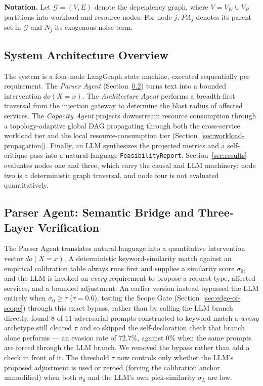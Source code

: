 \documentclass[journal, 10pt]{IEEEtran}
\begin{document}
\textbf{Notation.} Let $\mathcal{G} = (V, E)$ denote the dependency graph, where $V = V_W \cup V_R$ partitions into workload and resource nodes. For node $j$, $PA_j$ denotes its parent set in $\mathcal{G}$ and $N_j$ its exogenous noise term.

\subsection{System Architecture Overview}
The system is a four-node LangGraph state machine, executed sequentially per requirement. The \emph{Parser Agent} (Section~\ref{sec:parser-agent}) turns text into a bounded intervention $do(X{=}x)$. The \emph{Architecture Agent} performs a breadth-first traversal from the injection gateway to determine the blast radius of affected services. The \emph{Capacity Agent} projects downstream resource consumption through a topology-adaptive global DAG propagating through both the cross-service workload tier and the local resource-consumption tier (Section~\ref{sec:workload-propagation}). Finally, an LLM synthesizes the projected metrics and a self-critique pass into a natural-language \texttt{FeasibilityReport}. Section~\ref{sec:results} evaluates nodes one and three, which carry the causal and LLM machinery; node two is a deterministic graph traversal, and node four is not evaluated quantitatively.

\subsection{Parser Agent: Semantic Bridge and Three-Layer Verification}
\label{sec:parser-agent}
The Parser Agent translates natural language into a quantitative intervention vector $do(X=x)$. A deterministic keyword-similarity match against an empirical calibration table always runs first and supplies a similarity score $\sigma_0$, and the LLM is invoked on \emph{every} requirement to propose a request type, affected services, and a bounded adjustment. An earlier version instead bypassed the LLM entirely when $\sigma_0 \geq \tau$ ($\tau = 0.6$); testing the Scope Gate (Section~\ref{sec:edge-of-scope}) through this exact bypass, rather than by calling the LLM branch directly, found $8$ of $11$ adversarial prompts constructed to keyword-match a \emph{wrong} archetype still cleared $\tau$ and so skipped the self-declaration check that branch alone performs --- an evasion rate of $72.7\%$, against $0\%$ when the same prompts are forced through the LLM branch. We removed the bypass rather than add a check in front of it. The threshold $\tau$ now controls only whether the LLM's proposed adjustment is used or zeroed (forcing the calibration anchor unmodified) when both $\sigma_0$ and the LLM's own pick-similarity $\sigma_L$ are low.
\end{document}
